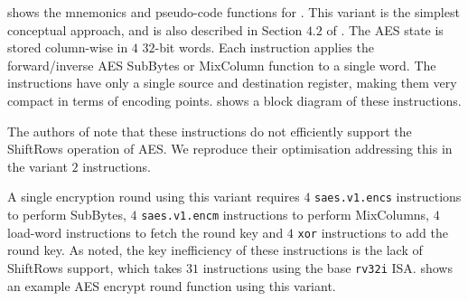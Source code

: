 
 shows the mnemonics and pseudo-code functions
for .
This variant is the simplest conceptual approach, and
is also described in Section $4.2$ of \cite{TilGro:06}.
The AES state is stored column-wise in $4$ $32$-bit words.
Each instruction applies the forward/inverse AES SubBytes or
MixColumn function to a single word.
The instructions have only a single source and destination register,
making them very compact in terms of encoding points.
 shows a block diagram of these
instructions.

The authors of \cite{TilGro:06} note that these instructions do not
efficiently support the ShiftRows operation of AES.  We reproduce their
optimisation addressing this in the variant $2$ instructions.

A single encryption round using this variant requires
$4$ {\tt saes.v1.encs} instructions to perform SubBytes,
$4$ {\tt saes.v1.encm} instructions to perform MixColumns,
$4$ load-word instructions to fetch the round key
and
$4$ {\tt xor} instructions to add the round key.
As noted, the key inefficiency of these instructions is the
lack of ShiftRows support, which takes $31$ instructions using the
base {\tt rv32i} ISA.
 shows an example AES encrypt round function
using this variant.

